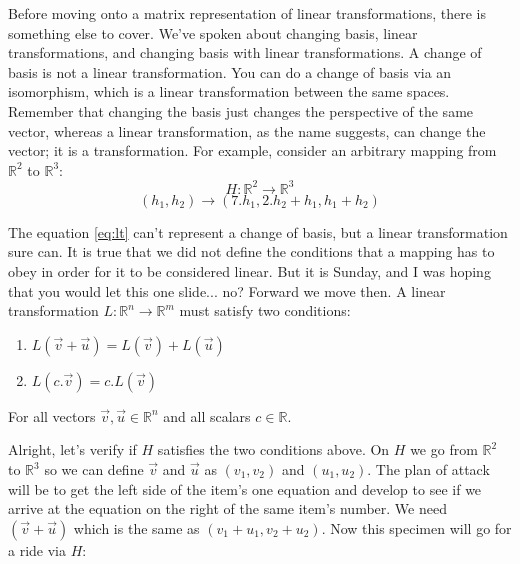 \documentclass[600paper, 11pt,twoside,openany]{kdp}
\begin{document}
\par 
\vspace{-3pt}
\indent Before moving onto a matrix representation of linear transformations, there is something else to cover. We’ve spoken about changing basis, linear transformations, and changing basis with linear transformations. A change of basis is not a linear transformation. You can do a change of basis via an isomorphism, which is a linear transformation between the same spaces. Remember that changing the basis just changes the perspective of the same vector, whereas a linear transformation, as the name suggests, can change the vector; it is a transformation. For example, consider an arbitrary  mapping from $\mathbb{R}^2$ to $\mathbb{R}^3$:
\begin{equation} \label{eq:lt}
H:\mathbb{R}^2 \rightarrow \mathbb{R}^3
\end{equation}
\[(h_1,h_2) \rightarrow (7.h_1, 2.h_2 + h_1, h_1+h_2) \]
\par 
\vspace{-3pt}
\indent The equation \ref{eq:lt} can’t represent a change of basis, but a linear transformation sure can. It is true that we did not define the conditions that a mapping has to obey in order for it to be considered linear. But it is Sunday, and I was hoping
that you would let this one slide... no? Forward we move then. A linear transformation $L:\mathbb{R}^n \rightarrow \mathbb{R}^m$ must satisfy two conditions:
\begin{tcolorbox}
\begin{enumerate}
\item $L(\overrightarrow{v} + \overrightarrow{u}) = L(\overrightarrow{v}) + L(\overrightarrow{u})$
\item $L(c.\overrightarrow{v}) = c.L(\overrightarrow{v})$
\end{enumerate}
\end{tcolorbox}
For all vectors $\overrightarrow{v},\overrightarrow{u} \in \mathbb{R}^n$ and all scalars $c \in \mathbb{R}$.
\par 
\vspace{-3pt}
\indent Alright, let's verify if $H$ satisfies the two conditions above. On $H$ we go from $\mathbb{R}^2$ to $\mathbb{R}^3$ so we can define $\overrightarrow{v}$ and $\overrightarrow{u}$ as $(v_1, v_2)$ and $(u_1, u_2)$. The plan of attack will be to get the left side of the item's one equation and develop to see if we arrive at the equation on the right of the same item's number. We need $(\overrightarrow{v} + \overrightarrow{u})$ which is the same as $(v_1 + u_1, v_2 + u_2)$. Now this specimen will go for a ride via $H$:
\end{document}
